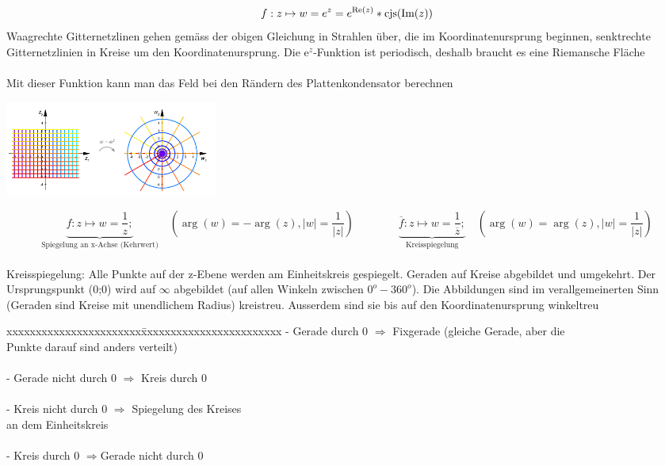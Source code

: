 	\begin{minipage}{11cm}
		$$ f : z \mapsto w = e^z =e^{\text{Re}(z)}*\operatorname{cjs}(\text{Im}(z))$$
		Waagrechte Gitternetzlinen gehen gemäss der obigen Gleichung in Strahlen
		über, die im Koordinatenursprung beginnen, senktrechte Gitternetzlinien in
		Kreise um den Koordinatenursprung. Die e$^z$-Funktion ist periodisch, deshalb
		braucht es eine Riemansche Fläche\\ \\
		Mit dieser Funktion kann man das Feld bei den Rändern des Plattenkondensator
		berechnen 
	\end{minipage}
	\hspace{1cm}
	\begin{minipage}{7cm}
		\includegraphics[width=7cm]{./bilder/exponentional.png} 		
	\end{minipage}
\newpage
{}
	$$\underbrace{f : z \mapsto w = \frac{1}{z};}_\text{Spiegelung an x-Achse (Kehrwert)} \quad (\arg(w) = -\arg(z), |w| = \frac{1}{|z|})
	\qquad \qquad 
	\underbrace{\overline{f}: z \mapsto w = \frac{1}{\overline{z}};}_\text{Kreisspiegelung}  \quad  
	(\arg(w) = \arg(z), |w| = \frac{1}{|z|}) $$\\
	Kreisspiegelung: Alle Punkte auf der z-Ebene werden am Einheitskreis gespiegelt.
	Geraden auf Kreise abgebildet und umgekehrt. Der Ursprungspunkt (0;0) wird auf
	$ \infty $ abgebildet (auf allen Winkeln zwischen $0^o-360^o$). Die
	Abbildungen sind
	im verallgemeinerten Sinn (Geraden sind Kreise mit unendlichem Radius)
	kreistreu. Ausserdem sind sie bis auf den Koordinatenursprung winkeltreu\\
	\begin{minipage}{9cm}
		\begin{tabbing}
        	xxxxxxxxxxxxxxxxxxxxxxx\=xxxxxxxxxxxxxxxxxxxxxxxx\kill
	        - Gerade durch 0 $\Longrightarrow$ \>Fixgerade (gleiche Gerade, aber
	        die \\ \>Punkte darauf sind anders verteilt)\\ \\
			- Gerade nicht durch 0 $\Longrightarrow$ Kreis durch 0\\ \\ 
			- Kreis nicht durch 0 $\Longrightarrow$ \>Spiegelung des Kreises\\ \> an dem
			Einheitskreis\\ \\
			- Kreis durch 0 $\Longrightarrow$\>Gerade nicht durch 0
        \end{tabbing}
	\end{minipage}
